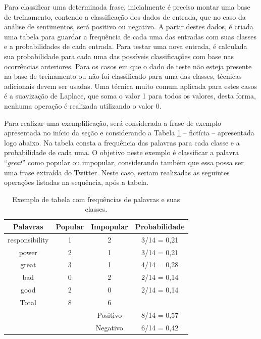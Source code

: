 \documentclass[oneside,openright,12pt]{ufsm_2015} %
\begin{document}
    \par Para classificar uma determinada frase, inicialmente é preciso montar uma base de treinamento, contendo a classificação dos dados de entrada, que no caso da análise de sentimentos, será positivo ou negativo. A partir destes dados, é criada uma tabela para guardar a frequência de cada uma das entradas com suas classes e a probabilidades de cada entrada. Para testar uma nova entrada, é calculada sua probabilidade para cada uma das possíveis classificações com base nas ocorrências anteriores. Para os casos em que o dado de teste não esteja presente na base de treinamento ou não foi classificado para uma das classes, técnicas adicionais devem ser usadas. Uma técnica muito comum aplicada para estes casos é a suavização de Laplace, que soma o valor 1 para todos os valores, desta forma, nenhuma operação é realizada utilizando o valor 0.
    
    \par Para realizar uma exemplificação, será considerada a frase de exemplo apresentada no início da seção e considerando a Tabela \ref{tab:naive-freq}  -- fictícia -- apresentada logo abaixo. Na tabela consta a frequência das palavras para cada classe e a probabilidade de cada uma. O objetivo neste exemplo é classificar a palavra ``\textit{great}'' como popular ou impopular, considerando também que essa possa ser uma frase extraída do Twitter. Neste caso, seriam realizadas as seguintes operações listadas na sequência, após a tabela.
    
    \begin{table}[ht]
        \caption{Exemplo de tabela com frequências de palavras e suas classes.}
        \centering
        \begin{tabular}{ c c c c }
            \hline
            Palavras & Popular & Impopular & Probabilidade \\
            \hline
            responsibility & 1 & 2 & 3/14 = 0,21 \\
            power & 2 & 1 & 3/14 = 0,21 \\
            great & 3 & 1 & 4/14 = 0,28 \\
            bad & 0 & 2 & 2/14 = 0,14 \\
            good & 2 & 0 & 2/14 = 0,14 \\
            \hline
            Total & 8 & 6 & \\
            \hline
            & & Positivo & 8/14 = 0,57 \\
            & & Negativo & 6/14 = 0,42 \\
            \hline
        \end{tabular}
        \vspace{\baselineskip} %
        \label{tab:naive-freq}
    \end{table}
    
\end{document}
